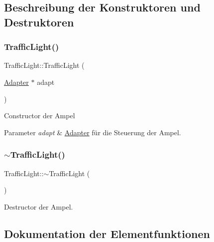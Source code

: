 \subsection{Beschreibung der Konstruktoren und Destruktoren}
\hypertarget{class_traffic_light_ac34af2ea06577584a1c30a4f40e2d521}{}\label{class_traffic_light_ac34af2ea06577584a1c30a4f40e2d521} 
\subsubsection{\texorpdfstring{Traffic\+Light()}{TrafficLight()}}
{\footnotesize\ttfamily Traffic\+Light\+::\+Traffic\+Light (\begin{DoxyParamCaption}\item[{\hyperlink{class_adapter}{Adapter} $\ast$}]{adapt }\end{DoxyParamCaption})}

Constructor der Ampel


\begin{DoxyParams}{Parameter}
{\em adapt} & \hyperlink{class_adapter}{Adapter} für die Steuerung der Ampel. \\
\hline
\end{DoxyParams}
\hypertarget{class_traffic_light_a3dd2a89a028c1586ced0ab587dda8cc1}{}\label{class_traffic_light_a3dd2a89a028c1586ced0ab587dda8cc1} 
\subsubsection{\texorpdfstring{$\sim$\+Traffic\+Light()}{~TrafficLight()}}
{\footnotesize\ttfamily Traffic\+Light\+::$\sim$\+Traffic\+Light (\begin{DoxyParamCaption}{ }\end{DoxyParamCaption})}

Destructor der Ampel. 

\subsection{Dokumentation der Elementfunktionen}
\hypertarget{class_traffic_light_a958814eefaf288da1e103bf32c5c38b9}{}\label{class_traffic_light_a958814eefaf288da1e103bf32c5c38b9} 
